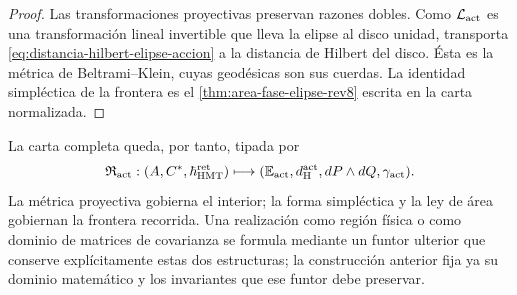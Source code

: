 \begin{proof}
Las transformaciones proyectivas preservan razones dobles. Como
\(\mathcal L_{\rm act}\) es una transformación lineal invertible que lleva
la elipse al disco unidad, transporta
\eqref{eq:distancia-hilbert-elipse-accion} a la distancia de Hilbert del
disco. Ésta es la métrica de Beltrami--Klein, cuyas geodésicas son sus cuerdas.
La identidad simpléctica de la frontera es el
\cref{thm:area-fase-elipse-rev8} escrita en la carta normalizada.
\end{proof}

La carta completa queda, por tanto, tipada por
\[
 \mathfrak R_{\rm act}:
 (A,C^*,\hbar_{\rm HMT}^{\rm ret})
 \longmapsto
 (\mathbb E_{\rm act},d_{\rm H}^{\rm act},
  dP\wedge dQ,\gamma_{\rm act}).
\]
La métrica proyectiva gobierna el interior; la forma simpléctica y la ley de
área gobiernan la frontera recorrida. Una realización como región física o
como dominio de matrices de covarianza se formula mediante un funtor ulterior
que conserve explícitamente estas dos estructuras; la construcción anterior
fija ya su dominio matemático y los invariantes que ese funtor debe preservar.
